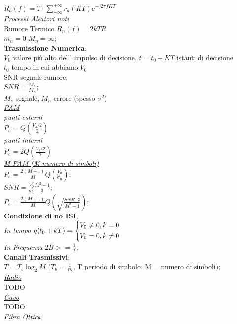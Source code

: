 \documentclass[a4paper]{article}
\begin{document}
\begin{multicols*}{3}
$R_a(f)=T\cdot\sum_{-\infty}^{+\infty}r_a(KT)e^{-j2\pi fKT}$ \\
\underline{\textit{Processi Aleatori noti}} \\
Rumore Termico $R_n(f)=2kTR$ \\
$m_n=0$ $M_n=\infty$; \\
\textbf{Trasmissione Numerica}; \\
$V_0$ valore più alto dell' impulso di decisione. 
$t=t_0 + KT$ istanti di decisione\\
$t_0$ tempo in cui abbiamo $V_0$ \\
SNR segnale-rumore; \\
$SNR=\frac{M_s}{M_n}$; \\ $M_s$ segnale, $M_n$ errore (spesso $\sigma^2$) \\ 
\underline{\textit{PAM}} \\
\textit{punti esterni}\\
$P_e = Q(\frac{V_o / 2}{2}) $ \\
\textit{punti interni }\\
$P_e = 2Q(\frac{V_o / 2}{2}) $ \\
\underline{\textit{M-PAM (M numero di simboli) }} \\
$P_e = \frac{2(M-1)}{M}Q(\frac{V_0}{\sigma_n})$;\\
$SNR = \frac{V_0^2}{\sigma_n^2}\frac{M^2-1}{3}$; \\
$P_e = \frac{2(M-1)}{M}Q(\sqrt{\frac{SNR \cdot 3}{M^2-1}})$; \\
\textbf{Condizione di no ISI}; \\
\textit{In tempo}
 $ q(t_{0}+kT)=
\begin{dcases}
    V_0\ne0 , k=0  \\
    V_0=0, k\ne0  \\
\end{dcases}
$ \\
\textit{In Frequenza}
$2B >= \frac{1}{T}$; \\
\textbf{Canali Trasmissivi}; \\
$T=T_b \log_{2}{M}$ ($T_b = \frac{1}{R_b}$, T periodo di simbolo,
M = numero di simboli);\\
\underline{\textit{Radio}} \\
TODO \\
\underline{\textit{Cavo}} \\
TODO \\
\underline{\textit{Fibra Ottica}} \\

\end{multicols*}
\end{document}
